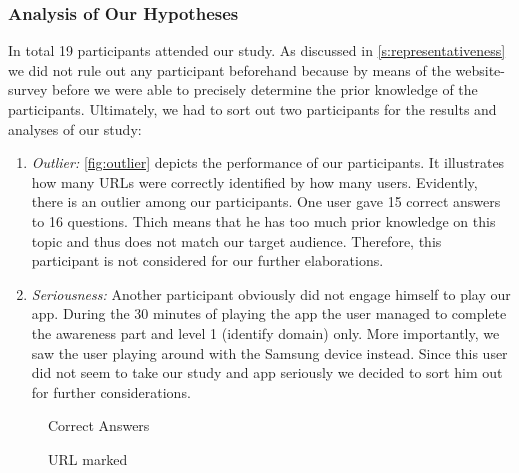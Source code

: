 \subsubsection{Analysis of Our Hypotheses}
\label{s:hypanalysis}
In total 19 participants attended our study.
As discussed in \autoref{s:representativeness} we did not rule out any participant beforehand because by means of the website-survey before we were able to precisely determine the prior knowledge of the participants.
Ultimately, we had to sort out two participants for the results and analyses of our study:

\begin{enumerate}
	\item\textit{Outlier:} \autoref{fig:outlier} depicts the performance of our participants.
	It illustrates how many URLs were correctly identified by how many users.
	Evidently, there is an outlier among our participants. 
	One user gave 15 correct answers to 16 questions.
	Thich means that he has too much prior knowledge on this topic and thus does not match our target audience.
	Therefore, this participant is not considered for our further elaborations.
	\item\textit{Seriousness:} Another participant obviously did not engage himself to play our app.
	During the 30 minutes of playing the app the user managed to complete the awareness part and level 1 (identify domain) only.
	More importantly, we saw the user playing around with the Samsung device instead.
	Since this user did not seem to take our study and app seriously we decided to sort him out for further considerations.
\end{enumerate}

\begin{figure}
\centering
{}
\caption{Correct Answers}
\label{fig:hyp1results}
\end{figure}

\begin{figure}
\centering
{}
\caption{URL marked}
\label{fig:hyp2results}
\end{figure}

